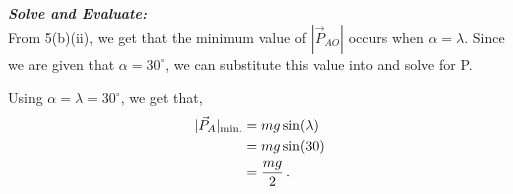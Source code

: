 \begin{subquestions}
\begin{subsubquestions}
	
	\subsubquestion
	
	\textbf{\textit{Solve and Evaluate:}} \\
	From 5(b)(ii), we get that the minimum value of $|\vec{P}_{AO}|$ occurs when $\alpha=\lambda$. Since we are given that $\alpha=30^\circ$, we can substitute this value into  and solve for P.
	
	Using $\alpha=\lambda=30^\circ$, we get that,
	\begin{align}
		|\vec{P}_{A}|_{\text{min.}} & = mg\sin(\lambda) \nonumber \\
		& = mg\sin(30) \nonumber \\
		& = \frac{mg}{2} \,.
	\end{align}
	
\end{subsubquestions}

\end{subquestions}